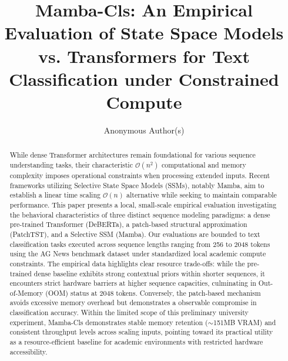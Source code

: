 \documentclass[runningheads]{llncs}
\begin{document}
\title{Mamba-Cls: An Empirical Evaluation of State Space Models vs. Transformers for Text Classification under Constrained Compute}

\author{Anonymous Author(s)}

\maketitle

\begin{abstract}
While dense Transformer architectures remain foundational for various sequence understanding tasks, their characteristic $\mathcal{O}(n^2)$ computational and memory complexity imposes operational constraints when processing extended inputs. Recent frameworks utilizing Selective State Space Models (SSMs), notably Mamba, aim to establish a linear time scaling $\mathcal{O}(n)$ alternative while seeking to maintain comparable performance. This paper presents a local, small-scale empirical evaluation investigating the behavioral characteristics of three distinct sequence modeling paradigms: a dense pre-trained Transformer (DeBERTa), a patch-based structural approximation (PatchTST), and a Selective SSM (Mamba). Our evaluations are bounded to text classification tasks executed across sequence lengths ranging from 256 to 2048 tokens using the AG News benchmark dataset under standardized local academic compute constraints. The empirical data highlights clear resource trade-offs: while the pre-trained dense baseline exhibits strong contextual priors within shorter sequences, it encounters strict hardware barriers at higher sequence capacities, culminating in Out-of-Memory (OOM) status at 2048 tokens. Conversely, the patch-based mechanism avoids excessive memory overhead but demonstrates a observable compromise in classification accuracy. Within the limited scope of this preliminary university experiment, Mamba-Cls demonstrates stable memory retention ($\sim$151MB VRAM) and consistent throughput levels across scaling inputs, pointing toward its practical utility as a resource-efficient baseline for academic environments with restricted hardware accessibility.

\end{abstract}
\end{document}
